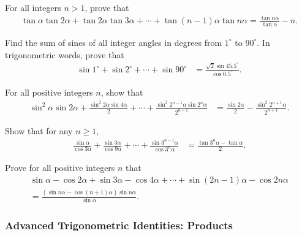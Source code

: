 \begin{question}
    For all integers $n>1$, prove that
    \begin{align*}
        \tan \alpha\tan2\alpha + \tan 2\alpha\tan 3\alpha + \cdots + \tan (n-1)\alpha\tan n\alpha = \frac{\tan n\alpha}{\tan \alpha} - n. 
    \end{align*}
\end{question}

\begin{question}
    Find the sum of sines of all integer angles in degrees from $1^\circ$ to $90^\circ$. In trigonometric words, prove that
    \begin{align*}
        \sin 1^{\circ} + \sin 2^{\circ} + \cdots + \sin 90^{\circ} &= \frac{\sqrt{2}\sin{45.5^{\circ}}}{\cos{0.5^{\circ}}}.
    \end{align*}
\end{question}

\begin{question}
    For all positive integers $n$, show that
    \begin{align*}
        \sin^2\alpha \sin 2\alpha + \frac{\sin^2 2\alpha \sin 4\alpha}{2} + \cdots + \frac{\sin^2 2^{n-1}\alpha\sin 2^n\alpha}{2^{n-1}} &= \frac{\sin 2\alpha}{2} - \frac{\sin^2 2^{n+1}\alpha}{2^{n+1}}.
    \end{align*}
\end{question}


\begin{question}
    Show that for any $n\geq 1$,
    \begin{align*}
        \frac{\sin \alpha}{\cos 3\alpha} + \frac{\sin 3\alpha}{\cos 9\alpha} + \cdots + \frac{\sin 3^{n-1}\alpha}{\cos 3^n\alpha} &= \frac{\tan 3^n\alpha - \tan \alpha}{2}. 
    \end{align*}
\end{question}



\begin{question}
    Prove for all positive integers $n$ that
    \begin{multline*}
        \sin \alpha - \cos 2\alpha + \sin 3\alpha - \cos 4\alpha +\cdots + \sin (2n-1)\alpha - \cos 2n\alpha \\ = \frac{\left(\sin n\alpha -\cos (n+1)\alpha\right)\sin n\alpha}{\sin \alpha}.
    \end{multline*}
\end{question}


\subsubsection{Advanced Trigonometric Identities: Products}

